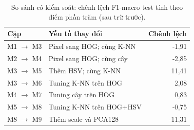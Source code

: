 \begin{table}[H]\centering\small
\caption{So sánh có kiểm soát: chênh lệch F1-macro test tính theo điểm phần trăm (sau trừ trước).}
\begin{tabular}{llr}\toprule
Cặp & Yếu tố thay đổi & Chênh lệch\\\midrule
M1 $\to$ M3 & Pixel sang HOG; cùng K-NN & -1,91\\
M2 $\to$ M4 & Pixel sang HOG; cùng cây & -2,85\\
M3 $\to$ M5 & Thêm HSV; cùng K-NN & 11,41\\
M3 $\to$ M6 & Tuning K-NN trên HOG & 2,08\\
M4 $\to$ M7 & Tuning cây trên HOG & 0,83\\
M5 $\to$ M8 & Tuning K-NN trên HOG+HSV & -0,75\\
M8 $\to$ M9 & Thêm scale và PCA128 & -11,31\\
\bottomrule\end{tabular}
\end{table}
